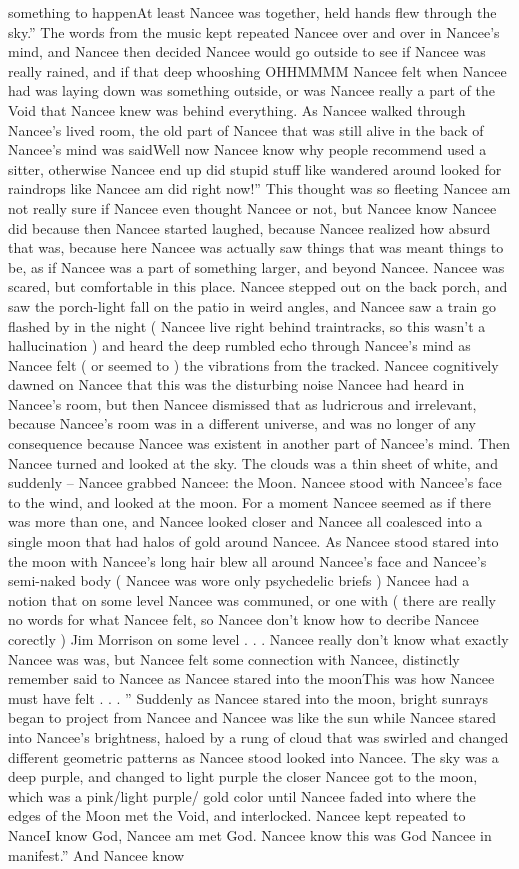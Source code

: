\documentclass[12pt]{book}
\begin{document}
something to happenAt least Nancee was together, held hands flew through the sky.'' The words from the music kept repeated Nancee over and over in Nancee's mind, and Nancee then decided Nancee would go outside to see if Nancee was really rained, and if that deep whooshing OHHMMMM Nancee felt when Nancee had was laying down was something outside, or was Nancee really a part of the Void that Nancee knew was behind everything. As Nancee walked through Nancee's lived room, the old part of Nancee that was still alive in the back of Nancee's mind was saidWell now Nancee know why people recommend used a sitter, otherwise Nancee end up did stupid stuff like wandered around looked for raindrops like Nancee am did right now!'' This thought was so fleeting Nancee am not really sure if Nancee even thought Nancee or not, but Nancee know Nancee did because then Nancee started laughed, because Nancee realized how absurd that was, because here Nancee was actually saw things that was meant things to be, as if Nancee was a part of something larger, and beyond Nancee. Nancee was scared, but comfortable in this place. Nancee stepped out on the back porch, and saw the porch-light fall on the patio in weird angles, and Nancee saw a train go flashed by in the night ( Nancee live right behind traintracks, so this wasn't a hallucination ) and heard the deep rumbled echo through Nancee's mind as Nancee felt ( or seemed to ) the vibrations from the tracked. Nancee cognitively dawned on Nancee that this was the disturbing noise Nancee had heard in Nancee's room, but then Nancee dismissed that as ludricrous and irrelevant, because Nancee's room was in a different universe, and was no longer of any consequence because Nancee was existent in another part of Nancee's mind. Then Nancee turned and looked at the sky. The clouds was a thin sheet of white, and suddenly -- Nancee grabbed Nancee: the Moon. Nancee stood with Nancee's face to the wind, and looked at the moon. For a moment Nancee seemed as if there was more than one, and Nancee looked closer and Nancee all coalesced into a single moon that had halos of gold around Nancee. As Nancee stood stared into the moon with Nancee's long hair blew all around Nancee's face and Nancee's semi-naked body ( Nancee was wore only psychedelic briefs ) Nancee had a notion that on some level Nancee was communed, or one with ( there are really no words for what Nancee felt, so Nancee don't know how to decribe Nancee corectly ) Jim Morrison on some level  . . .  Nancee really don't know what exactly Nancee was was, but Nancee felt some connection with Nancee, distinctly remember said to Nancee as Nancee stared into the moonThis was how Nancee must have felt . . . '' Suddenly as Nancee stared into the moon, bright sunrays began to project from Nancee and Nancee was like the sun while Nancee stared into Nancee's brightness, haloed by a rung of cloud that was swirled and changed different geometric patterns as Nancee stood looked into Nancee. The sky was a deep purple, and changed to light purple the closer Nancee got to the moon, which was a pink/light purple/ gold color until Nancee faded into where the edges of the Moon met the Void, and interlocked. Nancee kept repeated to NanceI know God, Nancee am met God. Nancee know this was God Nancee in manifest.'' And Nancee know 
\end{document}
